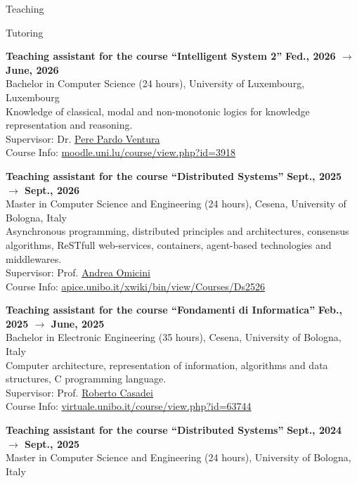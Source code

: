 \documentclass{resume} %
\begin{document}
\begin{rSection}{Teaching}
        \begin{rSubsection2}{Tutoring}
            \item\textbf{Teaching assistant for the course ``Intelligent System 2'' }\hfill \textbf{Fed., 2026 $\rightarrow$ June, 2026}
            \\Bachelor in Computer Science (24 hours), University of Luxembourg, Luxembourg
            \\Knowledge of classical, modal and non-monotonic logics for knowledge representation and reasoning.
            \\Supervisor: Dr. \href{mailto:pere.pardo@uni.lu}{Pere Pardo Ventura}
            \\Course Info: \url{moodle.uni.lu/course/view.php?id=3918}
            \item\textbf{Teaching assistant for the course ``Distributed Systems'' }\hfill \textbf{Sept., 2025 $\rightarrow$ Sept., 2026}
            \\Master in Computer Science and Engineering (24 hours), Cesena, University of Bologna, Italy
            \\Asynchronous programming, distributed principles and architectures, consensus algorithms, ReSTfull web-services, containers, agent-based technologies and middlewares.
            \\Supervisor: Prof. \href{mailto:andrea.omicini@unibo.it}{Andrea Omicini}
            \\Course Info: \url{apice.unibo.it/xwiki/bin/view/Courses/Ds2526}
            \item\textbf{ Teaching assistant for the course ``Fondamenti di Informatica'' }\hfill \textbf{Feb., 2025 $\rightarrow$ June, 2025}
            \\Bachelor in Electronic Engineering (35 hours), Cesena, University of Bologna, Italy
            \\Computer architecture, representation of information, algorithms and data structures, C programming language.
            \\Supervisor: Prof. \href{mailto:roberto.casadei@unibo.it}{Roberto Casadei}
            \\Course Info: \url{virtuale.unibo.it/course/view.php?id=63744}
            \item\textbf{Teaching assistant for the course ``Distributed Systems'' }\hfill \textbf{Sept., 2024 $\rightarrow$ Sept., 2025}
            \\Master in Computer Science and Engineering (24 hours), University of Bologna, Italy

\end{rSubsection2}
\end{rSection}
\end{document}
